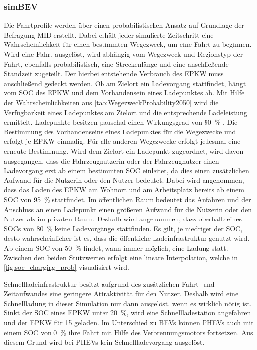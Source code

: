 


\subsubsection{simBEV}

Die Fahrtprofile werden über einen probabilistischen Ansatz auf Grundlage der Befragung \gls{MID} erstellt.
Dabei erhält jeder simulierte Zeitschritt eine Wahrscheinlichkeit für einen bestimmten Wegezweck, um eine Fahrt zu beginnen.
Wird eine Fahrt ausgelöst, wird abhängig vom Wegezweck und Regionstyp der Fahrt, ebenfalls probabilistisch, eine Streckenlänge und eine anschließende Standzeit zugeteilt.
Der hierbei entstehende Verbrauch des \gls{EPKW} muss anschließend gedeckt werden.
Ob am Zielort ein Ladevorgang stattfindet, hängt vom \gls{SOC} des \gls{EPKW} und dem Vorhandensein eines Ladepunktes ab.
Mit Hilfe der Wahrscheinlichkeiten aus \autoref{tab:WegezweckProbability2050} wird die Verfügbarkeit eines Ladepunktes am Zielort und die entsprechende Ladeleistung ermittelt.
Ladepunkte besitzen pauschal einen Wirkungsgrad von \SI{90}{\percent} \cite{EliaGroup2020}.
Die Bestimmung des Vorhandenseins eines Ladepunktes für die Wegezwecke \nH und \Arbeit erfolgt je \gls{EPKW} einmalig.
Für alle anderen Wegezwecke erfolgt jedesmal eine erneute Bestimmung.
Wird dem Zielort ein Ladepunkt zugeordnet, wird davon ausgegangen, dass die Fahrzeugnutzerin oder der Fahrzeugnutzer einen Ladevorgang erst ab einem bestimmten \gls{SOC} einleitet, da dies einen zusätzlichen Aufwand für die Nutzerin oder den Nutzer bedeutet.
Dabei wird angenommen, dass das Laden des \gls{EPKW} am Wohnort und am Arbeitsplatz bereits ab einem \gls{SOC} von \SI{95}{\percent} stattfindet.
Im öffentlichen Raum bedeutet das Anfahren und der Anschluss an einen Ladepunkt einen größeren Aufwand für die Nutzerin oder den Nutzer als im privaten Raum.
Deshalb wird angenommen, dass oberhalb eines \glspl{SOC} von \SI{80}{\percent} keine Ladevorgänge stattfinden.
Es gilt, je niedriger der \gls{SOC}, desto wahrscheinlicher ist es, dass die öffentliche Ladeinfrastruktur genutzt wird.
Ab einem \gls{SOC} von \SI{50}{\percent} findet, wann immer möglich, eine Ladung statt.
Zwischen den beiden Stützwerten erfolgt eine lineare Interpolation, welche in \autoref{fig:soc_charging_prob} visualisiert wird.



Schnellladeinfrastruktur besitzt aufgrund des zusätzlichen Fahrt- und Zeitaufwandes eine geringere Attraktivität für den Nutzer.
Deshalb wird eine Schnellladung in dieser Simulation nur dann ausgelöst, wenn es wirklich nötig ist.
Sinkt der \gls{SOC} eines \gls{EPKW} unter \SI{20}{\percent}, wird eine Schnellladestation angefahren und der \gls{EPKW} für \SI{15}{\Minuten} geladen.
Im Unterschied zu \glspl{BEV} können \glspl{PHEV} auch mit einem \gls{SOC} von \SI{0}{\percent} ihre Fahrt mit Hilfe des Verbrennungsmotors fortsetzen.
Aus diesem Grund wird bei \glspl{PHEV} kein Schnellladevorgang ausgelöst.\medskip


